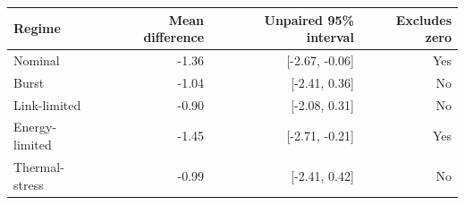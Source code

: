 \begin{tabular}{lrrr}
\toprule
Regime & Mean difference & Unpaired 95\% interval & Excludes zero \\
\midrule
Nominal & -1.36 & [-2.67, -0.06] & Yes \\
Burst & -1.04 & [-2.41, 0.36] & No \\
Link-limited & -0.90 & [-2.08, 0.31] & No \\
Energy-limited & -1.45 & [-2.71, -0.21] & Yes \\
Thermal-stress & -0.99 & [-2.41, 0.42] & No \\
\bottomrule
\end{tabular}